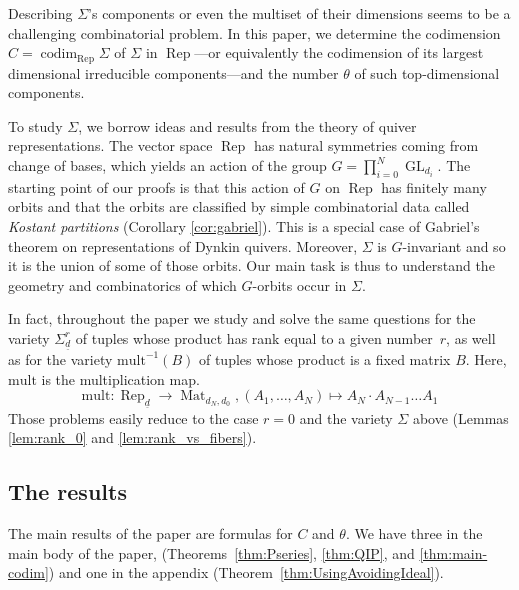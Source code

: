 \documentclass[a4paper]{amsart}
\DeclareMathOperator{\Rep}{\mathrm{Rep}}
\DeclareMathOperator{\Mat}{\mathrm{Mat}}
\DeclareMathOperator{\codim}{\mathrm{codim}}
\DeclareMathOperator{\GL}{\mathrm{GL}}
\newcommand{\ud}{\underline{d}}
\newcommand{\mult}{\mathrm{mult}}
\newcommand{\codimnot}{C}
\theoremstyle{plain}
\begin{document}
Describing $\Sigma$'s components or even the multiset of their dimensions seems to be a challenging combinatorial problem. In this paper, we determine the codimension $\codimnot=\codim_{\Rep}\Sigma$ of $\Sigma$ in $\Rep$---or equivalently the codimension of its largest dimensional irreducible components---and the number $\theta$ of such top-dimensional components. 

To study $\Sigma$, we borrow ideas and results from the theory of quiver representations. 
The vector space $\Rep$ has natural symmetries coming from change of bases, which yields an action of the group $G=\prod_{i=0}^{N} \GL_{d_i}$. The starting point of our proofs is that this action of $G$ on $\Rep$ has finitely many orbits and that the orbits are classified by simple combinatorial data called \emph{Kostant partitions} (Corollary \ref{cor:gabriel}). This is a special case of Gabriel's theorem on representations of Dynkin quivers. Moreover, $\Sigma$ is $G$-invariant and so it is the union of some of those orbits. Our main task is thus to understand the geometry and combinatorics of which $G$-orbits occur in $\Sigma$.

In fact, throughout the paper we study and solve the same questions for the variety $\Sigma^{r}_{\ud}$ of tuples whose product has rank equal to a given number~$r$, as well as for the variety $\mult^{-1}(B)$ of tuples whose product is a fixed matrix $B$. Here, $\mult$ is the multiplication map.
\[
\mult:\Rep_{\ud}\to \Mat_{d_N,d_0}, (A_1,\ldots,A_N)\mapsto A_N\cdot A_{N-1}\ldots A_1
\]
Those problems easily reduce to the case $r=0$ and the variety $\Sigma$ above (Lemmas \ref{lem:rank_0} and \ref{lem:rank_vs_fibers}).

\subsection{The results}
The main results of the paper are formulas for $\codimnot$ and $\theta$. We have three in the main body of the paper, (Theorems~\ref{thm:Pseries}, \ref{thm:QIP}, and \ref{thm:main-codim}) and one in the appendix (Theorem~\ref{thm:UsingAvoidingIdeal}).
\end{document}
